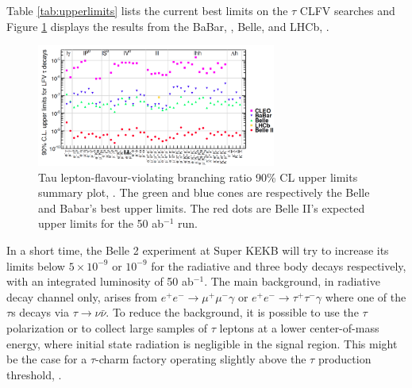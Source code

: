 Table \ref{tab:upperlimits} lists the 
current best limits on the $\tau$ 
CLFV searches and Figure \ref{fig:tauchannel} 
displays the results from the BaBar, 
\cite{PhysRevD.77.091104}, Belle, 
\cite{ABASHIAN2002117} and LHCb, 
\cite{TheLHCbCollaboration2008}. 
\begin{figure}[!h]
  \centering
  \includegraphics[width =0.7\textwidth]{figures/png/Screenshot_20240319_134052.png}
  \caption[Tau lepton-flavour-violating branching ratio upper limits.]{Tau lepton-flavour-violating branching ratio 90\% CL upper limits summary plot, \cite{universe4100101}. The green and blue cones 
  are respectively the Belle and Babar's best upper limits. The red dots are Belle II's expected upper limits for the 50 ab$^{-1}$ run.}
  \label{fig:tauchannel}
  \end{figure}
In a short time, the Belle 2 experiment at 
Super KEKB will try to increase its limits 
below $5 \times 10^{-9}$ or $10^{-9}$ for 
the radiative and three body decays respectively, 
with an integrated luminosity of 50 ab$^{-1}$. 
The main background, in radiative decay  
channel only, arises from
$e^+ e^- \rightarrow \mu^+ \mu^- \gamma$ or 
$e^+ e^- \rightarrow \tau^+ \tau^- \gamma$ 
where one of the $\tau$s decays via 
$\tau \rightarrow \nu \bar{\nu}$.
To reduce the background, it is possible to 
use the $\tau$ polarization or to collect 
large samples of
$\tau$ leptons at a lower center-of-mass energy, 
where initial state radiation is negligible in 
the signal region. This might be the case
for a $\tau$-charm 
factory operating slightly above the $\tau$ 
production threshold, \cite{Bennett_2016}. 





